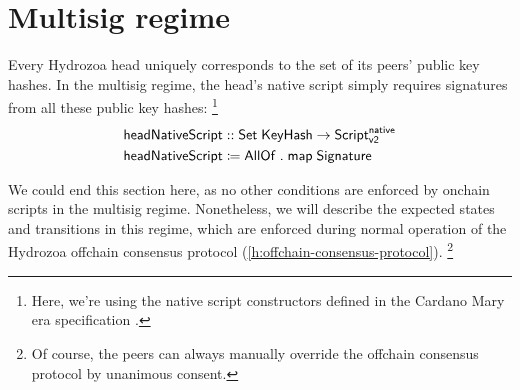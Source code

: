 \documentclass[../hydrozoa.tex]{subfiles}
\begin{document}
\section{Multisig regime}%
\label{h:multisig-regime}%
\newcommand{\headBeaconTokenNum}[0]{4937}
Every Hydrozoa head uniquely corresponds to the set of its peers' public key hashes.
In the multisig regime, the head's native script simply requires signatures from all these public key hashes:%
\footnote{Here, we're using the native script constructors defined in the Cardano Mary era specification \citep{PolinaVinogradovaAndreKnispelFormalSpecificationCardano2020}.}
\begin{equation*}
\begin{split}
  \mathsf{headNativeScript} &:: \mathsf{Set} \; \mathsf{KeyHash} -> \mathsf{Script}^{\mathsf{native}}_{\mathsf{v2}} \\
  \mathsf{headNativeScript} &\coloneq
    \mathsf{AllOf} \;.\; \mathsf{map} \; \mathsf{Signature}
\end{split}
\end{equation*}

We could end this section here, as no other conditions are enforced by onchain scripts in the multisig regime.
Nonetheless, we will describe the expected states and transitions in this regime, which are enforced during normal operation of the Hydrozoa offchain consensus protocol (\cref{h:offchain-consensus-protocol}).%
\footnote{Of course, the peers can always manually override the offchain consensus protocol by unanimous consent.}
\end{document}
